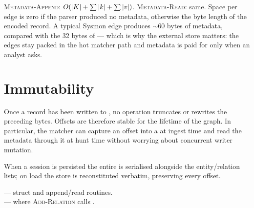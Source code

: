 \begin{complexity}
\textsc{Metadata-Append}: $O(|K| + \sum |k| + \sum |v|)$.
\textsc{Metadata-Read}: same.  Space per edge is zero if the
parser produced no metadata, otherwise the byte length of the
encoded record. A typical Sysmon edge produces $\sim$60 bytes of
metadata, compared with the 32 bytes of \Compact{} --- which is
why the external store matters: the edges stay packed in the hot
matcher path and metadata is paid for only when an analyst asks.
\end{complexity}

\section{Immutability}

\begin{invariant}
Once a record has been written to , no
operation truncates or rewrites the preceding bytes. Offsets are
therefore stable for the lifetime of the graph. In particular, the
matcher can capture an offset into a \Compact{} at ingest time and
read the metadata through it at hunt time without worrying about
concurrent writer mutation.
\end{invariant}

When a session is persisted the entire  is
serialised alongside the entity/relation lists; on load the store
is reconstituted verbatim, preserving every offset.

\begin{inthecode}
 --- struct
and append/read routines.\\
 --- where
\textsc{Add-Relation} calls .
\end{inthecode}
